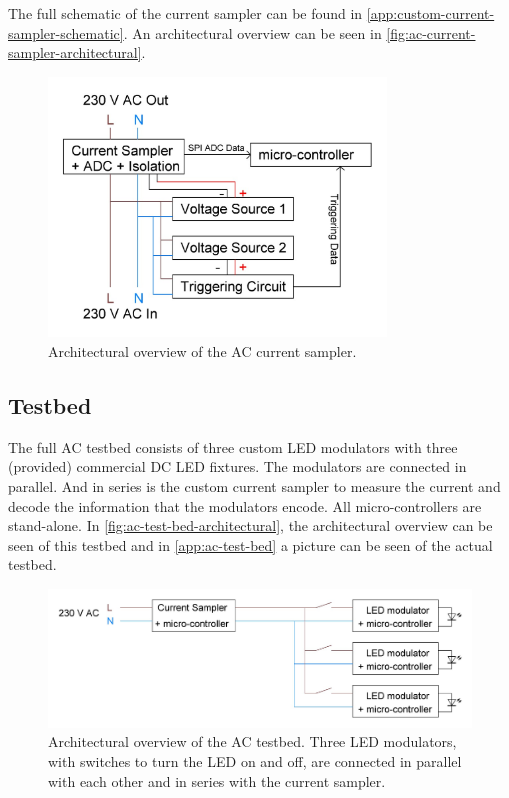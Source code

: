 The full schematic of the current sampler can be found in \autoref{app:custom-current-sampler-schematic}.
An architectural overview can be seen in \autoref{fig:ac-current-sampler-architectural}.

\begin{figure}[htb]
	\centering
	\includegraphics[angle=0,width=0.8\textwidth,keepaspectratio]{chapters/hardware-chapters/ac-current-sampler-architectural.JPG}
	\caption{Architectural overview of the AC current sampler.}
	\label{fig:ac-current-sampler-architectural}
\end{figure}





\subsection{Testbed}
\label{subsec:ac-testbed}

The full AC testbed consists of three custom LED modulators with three (provided) commercial DC LED fixtures.
The modulators are connected in parallel. 
And in series is the custom current sampler to measure the current and decode the information that the modulators encode.
All micro-controllers are stand-alone.
In \autoref{fig:ac-test-bed-architectural}, the architectural overview can be seen of this testbed and in \autoref{app:ac-test-bed} a picture can be seen of the actual testbed.

\begin{figure}[htb]
	\centering
	\includegraphics[angle=0,width=\textwidth,keepaspectratio]{chapters/hardware-chapters/ac-test-bed-architectural.JPG}
	\caption{Architectural overview of the AC testbed. Three LED modulators, with switches to turn the LED on and off, are connected in parallel with each other and in series with the current sampler.}
	\label{fig:ac-test-bed-architectural}
\end{figure}



